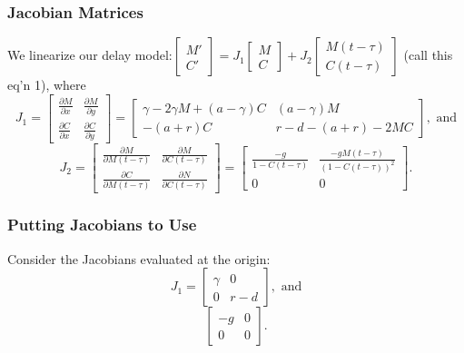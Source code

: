 \documentclass{beamer}
\begin{document}
\begin{frame}\frametitle{Jacobian Matrices}
We linearize our delay model:{\small $\begin{bmatrix} M'\\C'\end{bmatrix}=J_1\begin{bmatrix} M\\C\end{bmatrix}+J_2\begin{bmatrix}M(t-\tau)\\C(t-\tau)\end{bmatrix}$ (call this eq'n 1), where $$J_1=\begin{bmatrix}
\frac{\partial M}{\partial x} & \frac{\partial M}{\partial y}\\
\frac{\partial C}{\partial x} & \frac{\partial C}{\partial y}
\end{bmatrix}=\begin{bmatrix}\gamma-2\gamma M +(a-\gamma)C & (a-\gamma)M\\ -(a+r)C & r-d-(a+r)-2MC \end{bmatrix}, \text{ and}$$ $$J_2=\begin{bmatrix}
\frac{\partial M}{\partial M(t-\tau)} & \frac{\partial M}{\partial C(t-\tau)}\\
\frac{\partial C}{\partial M(t-\tau)} & \frac{\partial N}{\partial C(t-\tau)}
\end{bmatrix}=\begin{bmatrix} \frac{-g}{1-C(t-\tau)} & \frac{-gM(t-\tau)}{(1-C(t-\tau))^2}\\ 0 & 0\end{bmatrix}.$$}
\end{frame}

\begin{frame}\frametitle{Putting Jacobians to Use}
Consider the Jacobians evaluated at the origin:$$J_1=\begin{bmatrix}
\gamma & 0\\
0 & r-d
\end{bmatrix}, \text{ and}$$ $$\begin{bmatrix}
-g & 0\\
0 & 0
\end{bmatrix}.$$ 
\end{frame}
\end{document}
